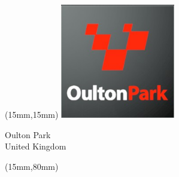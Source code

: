 \begin{textblock*}{50mm}(15mm,15mm)%
\includegraphics[width=50mm]{LG/2015-05-20_00091.png}
\par Oulton Park\\ United Kingdom
\end{textblock*}
\begin{textblock*}{185mm}(15mm,80mm)%
\end{textblock*}
